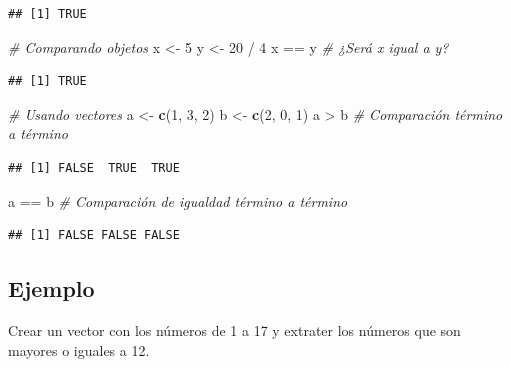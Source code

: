 \documentclass[10pt,]{krantz}
\makeatletter
\newenvironment{Shaded}{\begin{snugshade}}{\end{snugshade}}
\newcommand{\KeywordTok}[1]{\textcolor[rgb]{0.13,0.29,0.53}{\textbf{{#1}}}}
\newcommand{\DecValTok}[1]{\textcolor[rgb]{0.00,0.00,0.81}{{#1}}}
\newcommand{\StringTok}[1]{\textcolor[rgb]{0.31,0.60,0.02}{{#1}}}
\newcommand{\CommentTok}[1]{\textcolor[rgb]{0.56,0.35,0.01}{\textit{{#1}}}}
\newcommand{\NormalTok}[1]{{#1}}
\newenvironment{kframe}{%
\medskip{}
\setlength{\fboxsep}{.8em}
 \def\at@end@of@kframe{}%
 \ifinner\ifhmode%
  \def\at@end@of@kframe{\end{minipage}}%
  \begin{minipage}{\columnwidth}%
 \fi\fi%
 \def\FrameCommand##1{\hskip\@totalleftmargin \hskip-\fboxsep
 \colorbox{shadecolor}{##1}\hskip-\fboxsep
     \hskip-\linewidth \hskip-\@totalleftmargin \hskip\columnwidth}%
 \MakeFramed {\advance\hsize-\width
   \@totalleftmargin\z@ \linewidth\hsize
   \@setminipage}}%
 {\par\unskip\endMakeFramed%
 \at@end@of@kframe}
\renewenvironment{Shaded}{\begin{kframe}}{\end{kframe}}
\makeatother
\begin{document}
\begin{verbatim}
## [1] TRUE
\end{verbatim}

\begin{Shaded}
\begin{Highlighting}[]
\CommentTok{# Comparando objetos}
\NormalTok{x <-}\StringTok{ }\DecValTok{5}
\NormalTok{y <-}\StringTok{ }\DecValTok{20} \NormalTok{/}\StringTok{ }\DecValTok{4}
\NormalTok{x ==}\StringTok{ }\NormalTok{y  }\CommentTok{# ¿Será x igual a y?}
\end{Highlighting}
\end{Shaded}

\begin{verbatim}
## [1] TRUE
\end{verbatim}

\begin{Shaded}
\begin{Highlighting}[]
\CommentTok{# Usando vectores}
\NormalTok{a <-}\StringTok{ }\KeywordTok{c}\NormalTok{(}\DecValTok{1}\NormalTok{, }\DecValTok{3}\NormalTok{, }\DecValTok{2}\NormalTok{)}
\NormalTok{b <-}\StringTok{ }\KeywordTok{c}\NormalTok{(}\DecValTok{2}\NormalTok{, }\DecValTok{0}\NormalTok{, }\DecValTok{1}\NormalTok{)}
\NormalTok{a >}\StringTok{ }\NormalTok{b  }\CommentTok{# Comparación término a término}
\end{Highlighting}
\end{Shaded}

\begin{verbatim}
## [1] FALSE  TRUE  TRUE
\end{verbatim}

\begin{Shaded}
\begin{Highlighting}[]
\NormalTok{a ==}\StringTok{ }\NormalTok{b  }\CommentTok{# Comparación de igualdad término a término}
\end{Highlighting}
\end{Shaded}

\begin{verbatim}
## [1] FALSE FALSE FALSE
\end{verbatim}

\subsection*{Ejemplo}\label{ejemplo-14}


Crear un vector con los números de 1 a 17 y extrater los números que son
mayores o iguales a 12.
\end{document}
